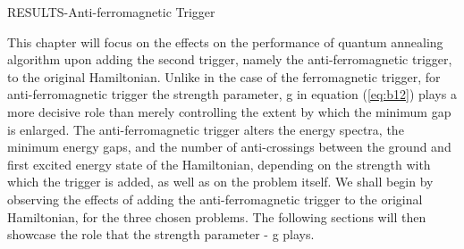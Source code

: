 \documentclass[12]{article}
\begin{document}
\begin{center}
\begin{Huge}
RESULTS-Anti-ferromagnetic Trigger
\end{Huge}
\end{center}
This chapter will focus on the effects on the performance of quantum annealing algorithm upon adding the second trigger, namely the anti-ferromagnetic trigger, to the original Hamiltonian. Unlike in the case of the ferromagnetic trigger, for anti-ferromagnetic trigger the strength parameter, g in equation (\ref{eq:b12}) plays a more decisive role than merely controlling the extent by which the minimum gap is enlarged. The anti-ferromagnetic trigger alters the energy spectra, the minimum energy gaps, and the number of anti-crossings between the ground and first excited energy state of the Hamiltonian, depending on the strength with which the trigger is added, as well as on the problem itself. We shall begin by observing the effects of adding the anti-ferromagnetic trigger to the original Hamiltonian, for the three chosen problems. The following sections will then showcase the role that the strength parameter - g plays.
\end{document}
